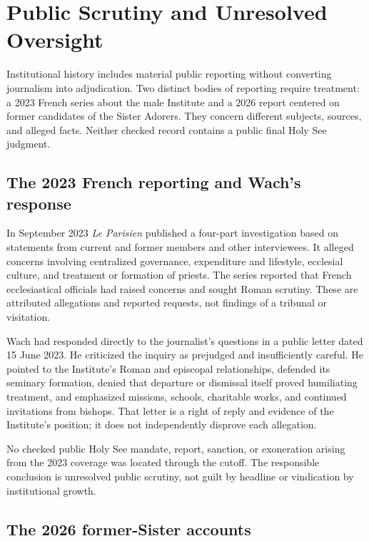 \section{Public Scrutiny and Unresolved Oversight}

Institutional history includes material public reporting without converting journalism into adjudication. Two distinct bodies of reporting require treatment: a 2023 French series about the male Institute and a 2026 report centered on former candidates of the Sister Adorers. They concern different subjects, sources, and alleged facts. Neither checked record contains a public final Holy See judgment.

\subsection{The 2023 French reporting and Wach's response}

In September 2023 \emph{Le Parisien} published a four-part investigation based on statements from current and former members and other interviewees. It alleged concerns involving centralized governance, expenditure and lifestyle, ecclesial culture, and treatment or formation of priests. The series reported that French ecclesiastical officials had raised concerns and sought Roman scrutiny. These are attributed allegations and reported requests, not findings of a tribunal or visitation.

Wach had responded directly to the journalist's questions in a public letter dated 15 June 2023. He criticized the inquiry as prejudged and insufficiently careful. He pointed to the Institute's Roman and episcopal relationships, defended its seminary formation, denied that departure or dismissal itself proved humiliating treatment, and emphasized missions, schools, charitable works, and continued invitations from bishops. That letter is a right of reply and evidence of the Institute's position; it does not independently disprove each allegation.

No checked public Holy See mandate, report, sanction, or exoneration arising from the 2023 coverage was located through the cutoff. The responsible conclusion is unresolved public scrutiny, not guilt by headline or vindication by institutional growth.

\subsection{The 2026 former-Sister accounts}

